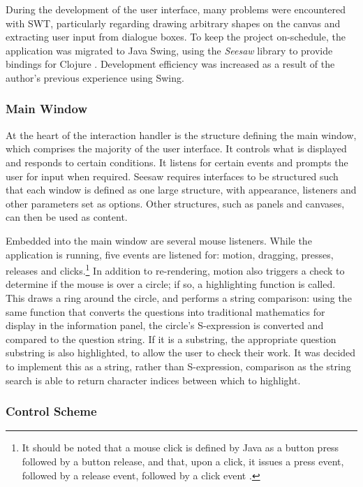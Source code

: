 \documentclass[12pt,twoside,notitlepage,xetex]{report}
\begin{document}
During the development of the user interface, many problems were encountered with SWT, particularly regarding drawing arbitrary shapes on the canvas and extracting user input from dialogue boxes.  To keep the project on-schedule, the application was migrated to Java Swing, using the \emph{Seesaw} library to provide bindings for Clojure \cite{Seesaw}.  Development efficiency was increased as a result of the author's previous experience using Swing.

\subsubsection{Main Window}

At the heart of the interaction handler is the structure defining the main window, which comprises the majority of the user interface.  It controls what is displayed and responds to certain conditions.  It listens for certain events and prompts the user for input when required.  Seesaw requires interfaces to be structured such that each window is defined as one large structure, with appearance, listeners and other parameters set as options.  Other structures, such as panels and canvases, can then be used as content.

Embedded into the main window are several mouse listeners.  While the application is running, five events are listened for: motion, dragging, presses, releases and clicks.\footnote{It should be noted that a mouse click is defined by Java as a button press followed by a button release, and that, upon a click, it issues a press event, followed by a release event, followed by a click event \cite{JavaApi}.}  In addition to re-rendering, motion also triggers a check to determine if the mouse is over a circle; if so, a highlighting function is called.  This draws a ring around the circle, and performs a string comparison: using the same function that converts the questions into traditional mathematics for display in the information panel, the circle's S-expression is converted and compared to the question string.  If it is a substring, the appropriate question substring is also highlighted, to allow the user to check their work.  It was decided to implement this as a string, rather than S-expression, comparison as the string search is able to return character indices between which to highlight.

\subsubsection{Control Scheme}
\end{document}
